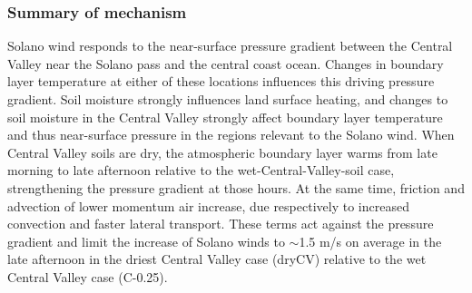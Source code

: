 \subsubsection{Summary of mechanism}
Solano wind responds to the near-surface pressure gradient between the Central Valley near the Solano pass and the central coast ocean.  Changes in boundary layer temperature at either of these locations influences this driving pressure gradient.  Soil moisture strongly influences land surface heating, and changes to soil moisture in the Central Valley strongly affect boundary layer temperature and thus near-surface pressure in the regions relevant to the Solano wind.  When Central Valley soils are dry, the atmospheric boundary layer warms from late morning to late afternoon relative to the wet-Central-Valley-soil case, strengthening the pressure gradient at those hours.  At the same time, friction and advection of lower momentum air increase, due respectively to increased convection and faster lateral transport.  These terms act against the pressure gradient and limit the increase of Solano winds to $\sim$1.5 m/s on average in the late afternoon in the driest Central Valley case (dryCV) relative to the wet Central Valley case (C-0.25).

%